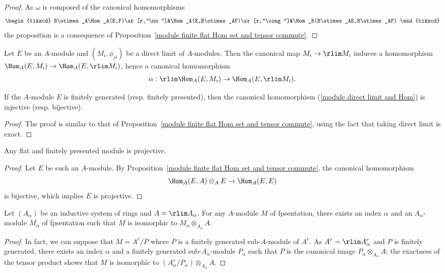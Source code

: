 \begin{proof}
As $\omega$ is composed of the canonical homomorphisms
\[\begin{tikzcd}
B\otimes_A\Hom_A(E,F)\ar[r,"\nu"]&\Hom_A(E,B\otimes_AF)\ar[r,"\cong"]&\Hom_B(B\otimes_AE,B\otimes_AF)
\end{tikzcd}\]
the proposition is a consequence of Proposition~\ref{module finite flat Hom set and tensor commute}.
\end{proof}
Let $E$ be an $A$-module and $(M_i,\phi_{ji})$ be a direct limit of $A$-modules. Then the canonical map $M_i\to\rlim M_i$ induces a homomorphism $\Hom_A(E,M_i)\to\Hom_A(E,\rlim M_i)$, hence a canonical homomorphism
\begin{align}\label{module direct limit and Hom}
\alpha:\rlim\Hom_A(E,M_i)\to\Hom_A(E,\rlim M_i).
\end{align}
\begin{proposition}\label{module fp Hom and direct limit}
If the $A$-module $E$ is finitely generated (resp. finitely presented), then the canonical homomorphism (\ref{module direct limit and Hom}) is injective (resp. bijective).
\end{proposition}
\begin{proof}
The proof is similar to that of Proposition~\ref{module finite flat Hom set and tensor commute}, using the fact that taking direct limit is exact.
\end{proof}
\begin{corollary}\label{module flat+fp is proj}
Any flat and finitely presented module is projective.
\end{corollary}
\begin{proof}
Let $E$ be such an $A$-module. By Proposition~\ref{module finite flat Hom set and tensor commute}, the canonical homomorphism
\[\Hom_A(E,A)\otimes_AE\to\Hom_A(E,E)\]
is bijective, which implies $E$ is projective. 
\end{proof}
\begin{proposition}\label{module fp over limit ring prop}
Let $(A_\alpha)$ be an inductive system of rings and $A=\rlim A_\alpha$. For any $A$-module $M$ of fpsentation, there exists an index $\alpha$ and an $A_\alpha$-module $M_\alpha$ of fpsentation such that $M$ is isomorphic to $M_\alpha\otimes_{A_\alpha}A$.
\end{proposition}
\begin{proof}
In fact, we can suppose that $M=A^r/P$ where $P$ is a finitely generated sub-$A$-module of $A^r$. As $A^r=\rlim A_\alpha^r$ and $P$ is finitely generated, there exists an index $\alpha$ and a finitely generated sub-$A_\alpha$-module $P_\alpha$ such that $P$ is the canonical image $P_\alpha\otimes_{A_\alpha}A$; the exactness of the tensor product shows that $M$ is isomorphic to $(A_\alpha^r/P_\alpha)\otimes_{A_\alpha}A$.
\end{proof}
